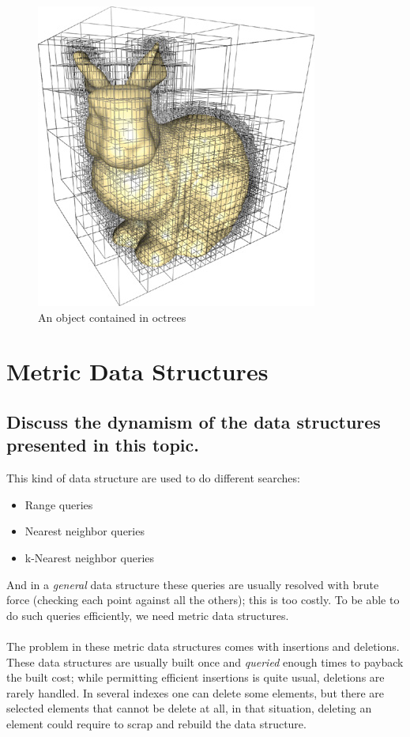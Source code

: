 \documentclass{article}
\begin{document}
\begin{figure}[H]
  \begin{center}
    \includegraphics{imgs/octree_example.jpg}
    \caption{An object contained in octrees}
    \label{fig:octree_example}
  \end{center}
\end{figure}

\newpage

\section{Metric Data Structures}
\subsection{Discuss the dynamism of the data structures presented in this topic.}
This kind of data structure are used to do different searches: 

\begin{itemize}
    \item Range queries
    \item Nearest neighbor queries
    \item k-Nearest neighbor queries
\end{itemize}

And in a \textit{general} data structure these queries are usually resolved with brute force (checking each point against all the others); this is too costly. To be able to do such queries efficiently, we need metric data structures.\\
\\
The problem in these metric data structures comes with insertions and deletions. These data structures are usually built once and \textit{queried} enough times to payback the built cost; while permitting efficient insertions is quite usual, deletions are rarely handled. In several indexes one can delete some elements, but there are selected elements that cannot be delete at all, in that situation, deleting an element could require to scrap and rebuild the data structure. \citep{dynamism}
\end{document}
